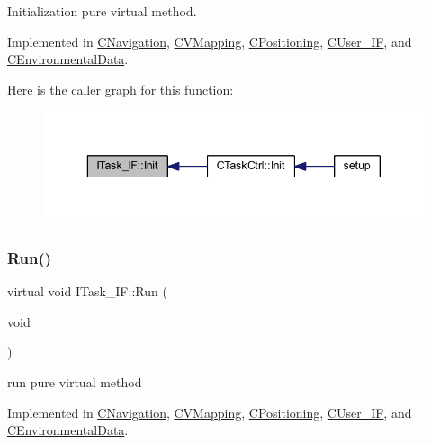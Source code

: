 Initialization pure virtual method. 



Implemented in \mbox{\hyperlink{class_c_navigation_a86a0756663ccf76e9c474764b8f7a04f}{C\+Navigation}}, \mbox{\hyperlink{class_c_v_mapping_a110257122b8946bcb8f17051070e03eb}{C\+V\+Mapping}}, \mbox{\hyperlink{class_c_positioning_abdceba66e701554a178acf61c61b0df6}{C\+Positioning}}, \mbox{\hyperlink{class_c_user___i_f_a02c8bba754c77583dc5afaa6877dc547}{C\+User\+\_\+\+IF}}, and \mbox{\hyperlink{class_c_environmental_data_a3321cce122ef1e1f7e995ee51353e87d}{C\+Environmental\+Data}}.

Here is the caller graph for this function\+:
\nopagebreak
\begin{figure}[H]
\begin{center}
\leavevmode
\includegraphics[width=343pt]{class_i_task___i_f_a28f608bdb9b19658403f7b9b7421968d_icgraph}
\end{center}
\end{figure}
\mbox{\label{class_i_task___i_f_ab73cc5879a61d00fc59b72cce32cc6f7}} 
\subsubsection{\texorpdfstring{Run()}{Run()}}
{\footnotesize\ttfamily virtual void I\+Task\+\_\+\+I\+F\+::\+Run (\begin{DoxyParamCaption}\item[{void}]{ }\end{DoxyParamCaption})\hspace{0.3cm}{\ttfamily [pure virtual]}}



run pure virtual method 



Implemented in \mbox{\hyperlink{class_c_navigation_a86acb1521aab400e542465c8eabed671}{C\+Navigation}}, \mbox{\hyperlink{class_c_v_mapping_a8f064fcfd01953d7072efd5de23f89ef}{C\+V\+Mapping}}, \mbox{\hyperlink{class_c_positioning_ad0e439dcc95c450548c2806077aeff57}{C\+Positioning}}, \mbox{\hyperlink{class_c_user___i_f_a1be2e11cd5df5ad0fa5a74a0eb283ec5}{C\+User\+\_\+\+IF}}, and \mbox{\hyperlink{class_c_environmental_data_a586a729d3aab2873812517d950c91242}{C\+Environmental\+Data}}.

